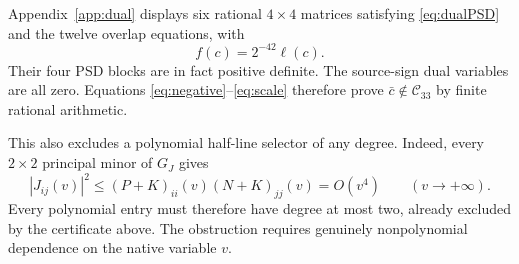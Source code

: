 \documentclass[10pt]{article}
\newcommand{\Cq}{\mathcal C_{33}}
\begin{document}
Appendix~\ref{app:dual} displays six rational $4\times4$ matrices satisfying
\eqref{eq:dualPSD} and the twelve overlap equations, with
\begin{equation}
                         f(c)=2^{-42}\ell(c).              \label{eq:scale}
\end{equation}
Their four PSD blocks are in fact positive definite. The source-sign dual
variables are all zero. Equations \eqref{eq:negative}--\eqref{eq:scale}
therefore prove $\bar c\notin\Cq$ by finite rational arithmetic.

This also excludes a polynomial half-line selector of any degree. Indeed,
every $2\times2$ principal minor of $G_J$ gives
\[
|J_{ij}(v)|^2\leq(P+K)_{ii}(v)(N+K)_{jj}(v)=O(v^4)
\qquad(v\longrightarrow+\infty).
\]
Every polynomial entry must therefore have degree at most two, already
excluded by the certificate above. The obstruction requires genuinely
nonpolynomial dependence on the native variable $v$.
\end{document}
